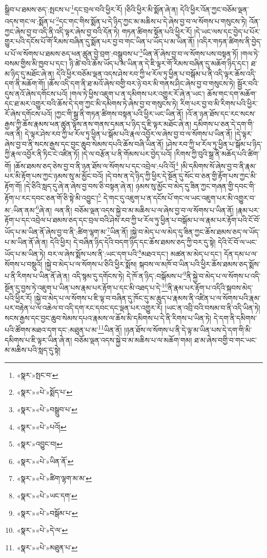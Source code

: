 སྒྲིབ་པ་ཐམས་ཅད་:སྤངས་པ་\footnote{«སྣར་»སྤང་བ་}དང་བྲལ་བའི་ཕྱིར་རོ། །ཅིའི་ཕྱིར་མི་སྨོན་ཞེ་ན། དེའི་ཕྱིར་འོན་ཀྱང་བཅོམ་ལྡན་འདས་གང་ལ་:སྨོན་པ་\footnote{«སྣར་»«པེ་»སྨོད་པ་}དང་གང་གིས་སྨོན་པ་དེ་ཉིད་ཀྱང་མ་མཆིས་པ་དེ་ཞེས་བྱ་བ་ལ་སོགས་པ་གསུངས་ཏེ། འོན་ཀྱང་ཞེས་བྱ་བ་འདི་ནི་འདི་ལྟར་ཞེས་བྱ་བའི་དོན་ཏེ། གཏན་ཚིགས་སྟོན་པའི་ཕྱིར་རོ། །དེ་ཡང་ལས་དང་བྱེད་པ་པོར་གྱུར་པའི་དངོས་པོ་གོ་རིམས་བཞིན་དུ་སྨོན་པར་བྱ་བ་གང་ཡིན་པ་ཡོད་པ་མ་ཡིན་ནོ། །འདིར་གཏན་ཚིགས་ནི་བྱེད་པ་པོ་ལ་སོགས་པ་ཐམས་ཅད་ཕན་ཚུན་བྱེ་བྲག་:བསྒྲུབས་པ་\footnote{«སྣར་»«པེ་»བསྒྲུབ་པ་}ཡིན་ནོ་ཞེས་བྱ་བ་ལ་སོགས་པས་བསྟན་ཏོ། །གལ་ཏེ་བསམ་གྱིས་མི་ཁྱབ་པ་དང་། ཉི་ཚེ་བའི་ཆོས་ཡོད་པ་མ་ཡིན་ན་དེ་ཇི་ལྟར་གོ་རིམས་བཞིན་དུ་མཆོག་ཉིད་དང་། ཐ་མ་ཉིད་དུ་མཐོང་ཞེ་ན། དེའི་ཕྱིར་བཅོམ་ལྡན་འདས་ཤེས་རབ་ཀྱི་ཕ་རོལ་ཏུ་ཕྱིན་པ་བསྒོམ་པ་ནི་འདི་ལྟར་ཆོས་འདི་དག་ནི་མཆོག་གོ། །ཆོས་འདི་དག་ནི་ཐ་མའོ་ཞེས་བགྱི་བར་ཉེ་བར་མི་གནས་ཤིང་ཞེས་བྱ་བ་གསུངས་ཏེ། སྦྱོར་བའི་དུས་ནའོ་ཞེས་དགོངས་པའོ། །གལ་ཏེ་ཕྱིས་འཇུག་པ་ན་དམིགས་པར་འགྱུར་རོ་ཞེ་ན་ཡང་། ཆོས་གང་དག་མཆོག་དང་ཐ་མར་འགྱུར་བའི་ཆོས་དེ་དག་ཀྱང་མི་དམིགས་ཏེ་ཞེས་བྱ་བ་གསུངས་ཏེ། རིག་པར་བྱ་བ་མི་རིགས་པའི་ཕྱིར་རོ་ཞེས་དགོངས་པའོ། །ཀྱང་གི་སྒྲ་ནི་གཏན་ཚིགས་བསྟན་པའི་ཕྱིར་ཡང་ཡིན་ནོ། །འོ་ན་ཉན་ཐོས་དང་རང་སངས་རྒྱས་ཀྱི་ཆོས་རྣམས་ཕན་ཚུན་ལྟོས་ནས་གནས་དམན་པ་ཉིད་དུ་ཇི་ལྟར་མཐོང་ཞེ་ན། དམིགས་པ་ཅན་དེ་དག་གི་ལན་ནི། དེ་ལྟར་ཤེས་རབ་ཀྱི་ཕ་རོལ་ཏུ་ཕྱིན་པ་སྒོམ་པའི་རྣལ་འབྱོར་ལ་ཞེས་བྱ་བ་ལ་སོགས་པ་ཡིན་ནོ། །དེ་ལྟར་ཞེས་བྱ་བ་ནི་སངས་རྒྱས་དང་བྱང་ཆུབ་སེམས་དཔའི་ཆོས་བཞི་ཡིན་ནོ། །ཤེས་རབ་ཀྱི་ཕ་རོལ་ཏུ་ཕྱིན་པ་སྒོམ་པ་ཉིད་ཀྱི་རྣལ་འབྱོར་ནི་ཏིང་ངེ་འཛིན་ཏོ། །དེ་ལ་བརྩོན་པ་ནི་གོམས་པར་བྱེད་པའོ། །རིགས་ཀྱི་བུའི་སྒྲ་ནི་མཆོད་པའི་ཚིག་གོ། །ཆོས་ཐམས་ཅད་ཅེས་བྱ་བ་ནི་ཉན་ཐོས་ལ་སོགས་པ་དང་འབྲེལ་:པའི་འོ།\footnote{«སྣར་»«པེ་»པའོ།} །མི་དམིགས་སོ་ཞེས་བྱ་བ་ནི་རྣམ་པར་མི་རྟོག་པས་ཀྱང་ཉམས་སུ་མ་མྱོང་བའོ། །དེ་བས་ན་དེ་ཉིད་ཀྱི་ཕྱིར་དེ་སྔོན་དུ་སོང་བ་ཅན་གྱི་རྟོག་པས་ཀྱང་མི་རྟོག་གོ། །དེ་ཅིའི་སླད་དུ་ཞེ་ན་ཞེས་བྱ་བས་ཅི་བསྟན་ཞེ་ན། ཉམས་སུ་མྱོང་བ་མེད་དུ་ཟིན་ཀྱང་གཞན་གྱི་དབང་གི་རྟོག་པ་རང་དབང་ཅན་གོ་ཅི་སྟེ་མི་འབྱུང་།\footnote{«སྣར་»འབྱུང་བ།} དེ་གང་དུ་འཇུག་པ་ན་དངོས་པོ་གང་ལ་ཡང་འཇུག་པར་མི་འགྱུར་བ་མ་:ཡིན་ནམ་\footnote{«སྣར་»«པེ་»ཡིན་ནོ་}ཞེ་ན། ལན་ནི། བཅོམ་ལྡན་འདས་སྐྱེ་བ་མ་མཆིས་པ་ལ་ཞེས་བྱ་བ་ལ་སོགས་པ་ཡིན་ནོ། །རྣམ་པར་རྟོག་པ་དང་འབྲེལ་པ་ཐམས་ཅད་དང་བྲལ་བའི་ཤེས་རབ་ཀྱི་ཕ་རོལ་ཏུ་ཕྱིན་པ་བསྒོམ་པ་ལ་རྣམ་པར་རྟོག་པའི་ངོ་བོ་ཡོད་པ་མ་ཡིན་ནོ་ཞེས་བྱ་བ་ནི་:ཚིག་ལྷག་མ་\footnote{«སྣར་»«པེ་»ཚིག་ལྷག་མ་མ་}ཡིན་ནོ། །སྐྱེ་བ་མེད་པ་ལ་མེད་དུ་ཟིན་ཀྱང་ཆོས་ཐམས་ཅད་ལ་ཡོད་པ་མ་ཡིན་ནོ་ཞེ་ན། དེའི་ཕྱིར། དེ་བཞིན་ཉིད་དེའི་བདག་ཉིད་དང་ཆོས་ཐམས་ཅད་ཀྱི་བར་དུ་སྟེ། དེའི་ངོ་བོ་ལ་ཡང་ཡོད་པ་མ་ཡིན་ཏེ། བར་ལ་ཞེས་སྨོས་པས་ནི་:ཡང་དག་པའི་\footnote{«སྣར་»«པེ་»ཡང་དག་}མཐའ་དང་། མཚན་མ་མེད་པ་དང་། དོན་དམ་པ་ལ་སོགས་པ་བསྡུའོ། །སྐྱེ་བ་མེད་པ་ལ་སོགས་པ་ཅིའི་ཕྱིར་སྨོས། སྐབས་ལ་མཁོ་བ་ཡིན་པའི་ཕྱིར་ཆོས་ཐམས་ཅད་སྨོས་པ་ནི་རིགས་པ་ཡིན་ནོ་ཞེ་ན། འདི་སྙམ་དུ་དགོངས་ཏེ། དེ་ཁོ་ན་ཉིད་:བསྒོམས་པ་\footnote{«སྣར་»«པེ་»བསྒོམ་པ་}ནི་སྐྱེ་བ་མེད་པ་ལ་སོགས་པ་འདི་སྔོན་དུ་བྱས་ཏེ་འཇུག་པ་ཡིན་པས་རྣམ་པར་རྟོག་པ་དང་མི་འཐད་པ་དེ་\footnote{«སྣར་»«པེ་»དེ་ལ་}ནི་རྣམ་པར་རྟོག་པ་འདིའི་སྐབས་མེད་པའི་ཕྱིར་རོ། །སྐྱེ་བ་མེད་པ་ལ་སོགས་པ་ཇི་ལྟ་བ་བཞིན་དུ་ཁོང་དུ་མ་ཆུད་པ་རྣམས་ནི་འཛིན་པ་ལ་སོགས་པའི་རྣམ་པར་བརྟེན་པ་ལ་འཆེལ་བ་འདི་དག་རང་དབང་དང་ལྡན་པར་འགྱུར་རོ། །ཡང་ན་འབྲི་བའི་བསམ་བ་ནི་འདི་ཡིན་ཏེ། སངས་རྒྱས་དང་བྱང་ཆུབ་སེམས་དཔའ་རྣམས་ལ་ཆོས་མི་དམིགས་པ་དེ་ནི་རིགས་པ་ཡིན་ཏེ། དེ་དག་ནི་དམིགས་པའི་ཚོགས་མཐའ་དག་དང་:མཐུན་པ་མ་\footnote{«སྣར་»«པེ་»མཐུན་པ་}ཡིན་ནོ། །ཉན་ཐོས་ལ་སོགས་པ་ནི་དེ་ལྟ་མ་ཡིན་པས་དེ་དག་གི་མི་དམིགས་པ་ཇི་ལྟར་ཡིན་ཞེ་ན། བཅོམ་ལྡན་འདས་སྐྱེ་བ་མ་མཆིས་པ་ལ་མཆོག་གམ། ཐ་མ་ཞེས་བགྱི་བ་གང་ཡང་མ་མཆིས་པའི་སླད་དུ་སྟེ། 